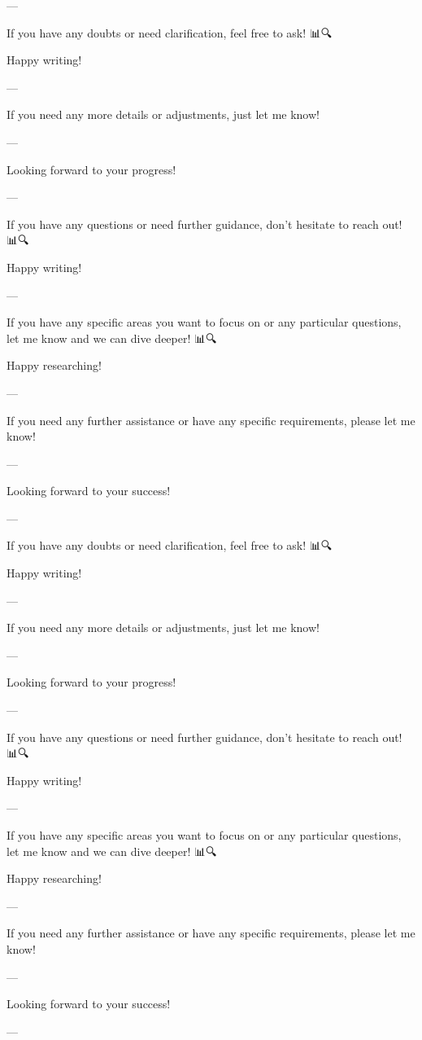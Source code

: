 --- 

If you have any doubts or need clarification, feel free to ask! 📊🔍

Happy writing! 📝✨

--- 

If you need any more details or adjustments, just let me know! 🙌

--- 

Looking forward to your progress! 🚀🌟

--- 

If you have any questions or need further guidance, don't hesitate to reach out! 📊🔍

Happy writing! 📝✨

--- 

If you have any specific areas you want to focus on or any particular questions, let me know and we can dive deeper! 📊🔍

Happy researching! 📝🚀

--- 

If you need any further assistance or have any specific requirements, please let me know! 🙌

--- 

Looking forward to your success! 🚀🌟

--- 

If you have any doubts or need clarification, feel free to ask! 📊🔍

Happy writing! 📝✨

--- 

If you need any more details or adjustments, just let me know! 🙌

--- 

Looking forward to your progress! 🚀🌟

--- 

If you have any questions or need further guidance, don't hesitate to reach out! 📊🔍

Happy writing! 📝✨

--- 

If you have any specific areas you want to focus on or any particular questions, let me know and we can dive deeper! 📊🔍

Happy researching! 📝🚀

--- 

If you need any further assistance or have any specific requirements, please let me know! 🙌

--- 

Looking forward to your success! 🚀🌟

--- 

